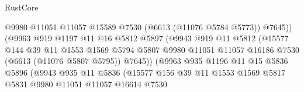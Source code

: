 \begin{lexlean}{RustCore}
\begin{coremodule}
                                      @9980
                                      @11051
                                      @11057
                                      @15589
                                      @7530
                                      (@6613 (@11076 @5784 @5773))
                                      @7645))
                                  (@9963
                                    @919
                                    @1197
                                    @11
                                    @16
                                    @5812
                                    @5897
                                    (@9943
                                      @919
                                      @11
                                      @5812
                                      (@15577
                                        @144
                                        @39
                                        @11
                                        @1553
                                        @1569
                                        @5794
                                        @5807
                                        @9980
                                        @11051
                                        @11057
                                        @16186
                                        @7530
                                        (@6613 (@11076 @5807 @5795))
                                        @7645))
                                    (@9963
                                      @935
                                      @1196
                                      @11
                                      @15
                                      @5836
                                      @5896
                                      (@9943
                                        @935
                                        @11
                                        @5836
                                        (@15577
                                          @156
                                          @39
                                          @11
                                          @1553
                                          @1569
                                          @5817
                                          @5831
                                          @9980
                                          @11051
                                          @11057
                                          @16614
                                          @7530

\end{coremodule}
\end{lexlean}
